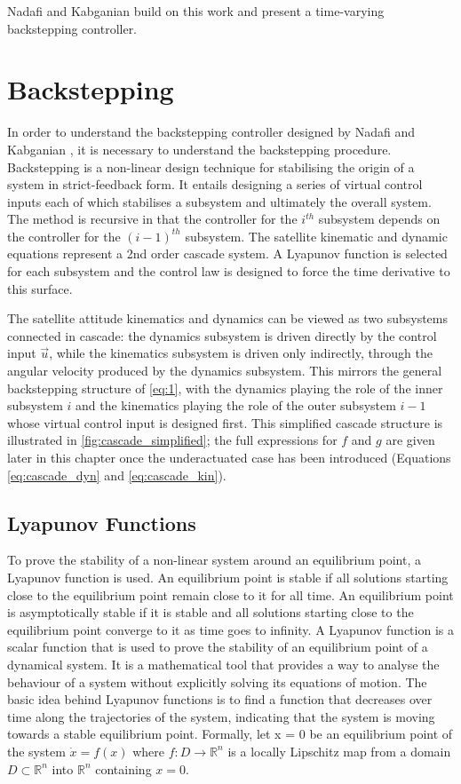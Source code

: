 Nadafi and Kabganian \cite{nadafiRobustBacksteppingAttitude2021} build on this work and present a time-varying backstepping controller.

\section{Backstepping}
\label{subsec:backstepping_procedure}
In order to understand the backstepping controller designed by Nadafi and Kabganian \cite{nadafiRobustBacksteppingAttitude2021}, it is necessary to understand the backstepping procedure. Backstepping is a non-linear design technique for stabilising the origin of a system in strict-feedback form. It entails designing a series of virtual control inputs each of which stabilises a subsystem and ultimately the overall system. The method is recursive in that the controller for the $i^{th}$ subsystem depends on the controller for the $(i-1)^{th}$ subsystem. The satellite kinematic and dynamic equations represent a 2nd order cascade system. A Lyapunov function is selected for each subsystem and the control law is designed to force the time derivative to this surface.

The satellite attitude kinematics and dynamics can be viewed as two subsystems connected in cascade: the dynamics subsystem is driven directly by the control input $\vec{u}$, while the kinematics subsystem is driven only indirectly, through the angular velocity produced by the dynamics subsystem. This mirrors the general backstepping structure of \autoref{eq:1}, with the dynamics playing the role of the inner subsystem $i$ and the kinematics playing the role of the outer subsystem $i-1$ whose virtual control input is designed first. This simplified cascade structure is illustrated in \autoref{fig:cascade_simplified}; the full expressions for $f$ and $g$ are given later in this chapter once the underactuated case has been introduced (Equations \eqref{eq:cascade_dyn} and \eqref{eq:cascade_kin}).


\subsection{Lyapunov Functions}
To prove the stability of a non-linear system around an equilibrium point, a Lyapunov function is used. An equilibrium point is stable if all solutions starting close to the equilibrium point remain close to it for all time. An equilibrium point is asymptotically stable if it is stable and all solutions starting close to the equilibrium point converge to it as time goes to infinity. A Lyapunov function is a scalar function that is used to prove the stability of an equilibrium point of a dynamical system. It is a mathematical tool that provides a way to analyse the behaviour of a system without explicitly solving its equations of motion. The basic idea behind Lyapunov functions is to find a function that decreases over time along the trajectories of the system, indicating that the system is moving towards a stable equilibrium point. Formally, let x = 0 be an equilibrium point of the system $\dot{x} = f(x)$ where $f : D \rightarrow \mathbb{R}^n$ is a locally Lipschitz map from a domain $D \subset \mathbb{R}^n$ into $\mathbb{R}^n$ containing $x=0$.

